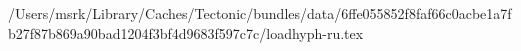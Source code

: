 /Users/msrk/Library/Caches/Tectonic/bundles/data/6ffe055852f8faf66c0acbe1a7fb27f87b869a90bad1204f3bf4d9683f597c7c/loadhyph-ru.tex